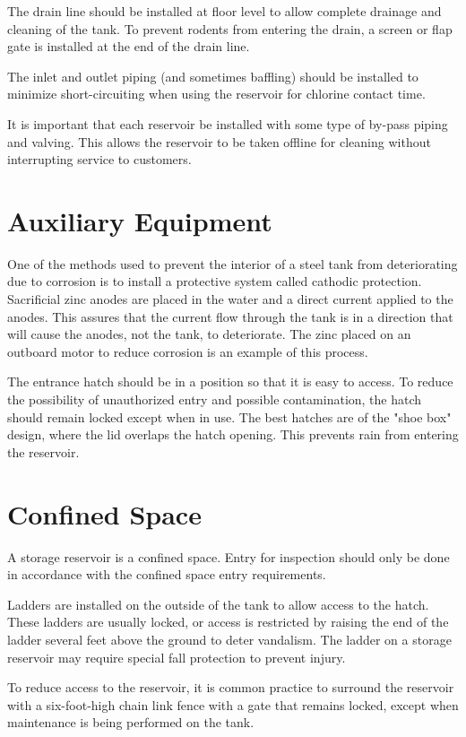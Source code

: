 \documentclass[10pt]{article}
\begin{document}
The drain line should be installed at floor level to allow complete drainage and cleaning of the tank. To prevent rodents from entering the drain, a screen or flap gate is installed at the end of the drain line.

The inlet and outlet piping (and sometimes baffling) should be installed to minimize short-circuiting when using the reservoir for chlorine contact time.

It is important that each reservoir be installed with some type of by-pass piping and valving. This allows the reservoir to be taken offline for cleaning without interrupting service to customers.

\section{Auxiliary Equipment}
One of the methods used to prevent the interior of a steel tank from deteriorating due to corrosion is to install a protective system called cathodic protection. Sacrificial zinc anodes are placed in the water and a direct current applied to the anodes. This assures that the current flow through the tank is in a direction that will cause the anodes, not the tank, to deteriorate. The zinc placed on an outboard motor to reduce corrosion is an example of this process.

The entrance hatch should be in a position so that it is easy to access. To reduce the possibility of unauthorized entry and possible contamination, the hatch should remain locked except when in use. The best hatches are of the "shoe box" design, where the lid overlaps the hatch opening. This prevents rain from entering the reservoir.

\section{Confined Space}
A storage reservoir is a confined space. Entry for inspection should only be done in accordance with the confined space entry requirements.

Ladders are installed on the outside of the tank to allow access to the hatch. These ladders are usually locked, or access is restricted by raising the end of the ladder several feet above the ground to deter vandalism. The ladder on a storage reservoir may require special fall protection to prevent injury.

To reduce access to the reservoir, it is common practice to surround the reservoir with a six-foot-high chain link fence with a gate that remains locked, except when maintenance is being performed on the tank.
\end{document}
